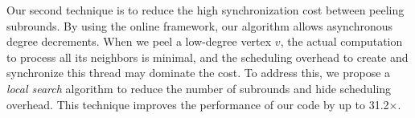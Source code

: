 Our second technique is to reduce the high synchronization cost between peeling subrounds. 
By using the online framework, our algorithm allows asynchronous degree decrements.
When we peel a low-degree vertex $v$, the actual computation to process all its neighbors is minimal,
and the scheduling overhead to create and synchronize this thread may dominate the cost.
To address this,
we propose a \emph{local search} algorithm to reduce the number of subrounds and hide scheduling overhead. 
This technique improves the performance of our code by up to 31.2$\times$. 


